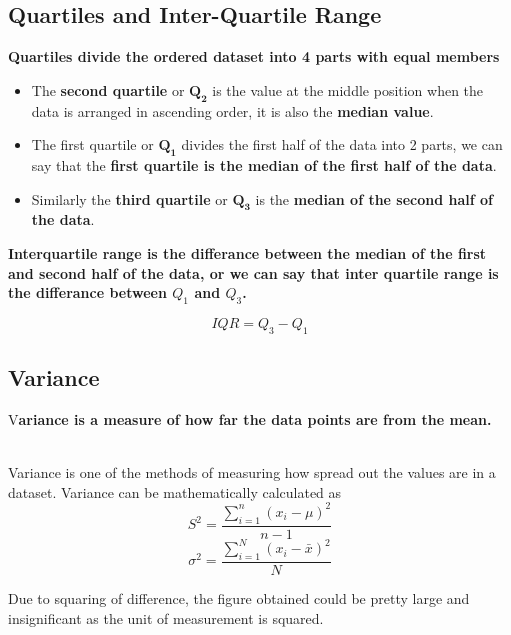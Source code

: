 \documentclass[twoside,12pt]{report}  %
\begin{document}
\subsection{Quartiles and Inter-Quartile Range}
\begin{tcolorbox}[colback=red!5!white, colframe=red!75!black, title=\textbf{Quartiles}]
	\textbf{Quartiles divide the ordered dataset into 4 parts with equal members}
\end{tcolorbox}
\begin{itemize}
	\item The \textbf{second quartile} or $\boldsymbol{Q_2}$ is the value at the middle position when the data is arranged in ascending order, it is also the \textbf{median value}.
	\item The first quartile or $\boldsymbol{Q_1}$ divides the first half of the data into 2 parts, we can say that the \textbf{first quartile is the median of the first half of the data}.
	\item Similarly the \textbf{third quartile} or $\boldsymbol{Q_3}$ is the \textbf{median of the second half of the data}.
\end{itemize}
\begin{tcolorbox}[colback=red!5!white,colframe=red!75!black, title= \textbf{Interquartile Range}]
	\textbf{Interquartile range is the differance between the median of the first and second half of the data, or we can say that inter quartile range is the differance between $Q_1$ and $Q_3$.}
\end{tcolorbox}
$$ \boxed{IQR = Q_3 - Q_1} $$
\subsection{Variance}
\begin{tcolorbox}[colback=red!5!white,colframe=red!75!black, title= \textbf{Variance}]
	V\textbf{ariance is a measure of how far the data points are from the mean.}
\end{tcolorbox}
\noindent
\\
Variance is one of the methods of measuring how spread out the values are in a dataset. Variance can be mathematically calculated as
$$ \boxed{S^2 = \frac{\sum_{i=1}^{n} (x_i - \mu)^2 }{n-1}} $$
$$ \boxed{\sigma^2 = \frac{\sum_{i=1}^{N} (x_i - \bar{x})^2 }{N}} $$

\noindent
Due to squaring of difference, the figure obtained could be pretty large and insignificant as the unit of measurement is squared.
\end{document}

